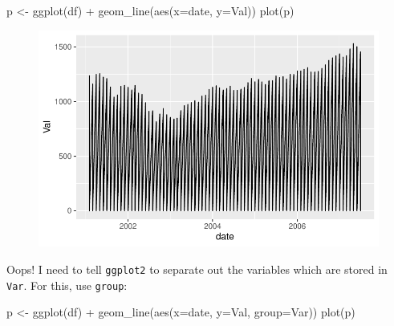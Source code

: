 \documentclass[
  letterpaper,
]{book}
\newenvironment{Shaded}{\begin{snugshade}}{\end{snugshade}}
\newcommand{\AttributeTok}[1]{\textcolor[rgb]{0.40,0.45,0.13}{#1}}
\newcommand{\FunctionTok}[1]{\textcolor[rgb]{0.28,0.35,0.67}{#1}}
\newcommand{\NormalTok}[1]{\textcolor[rgb]{0.00,0.23,0.31}{#1}}
\newcommand{\OtherTok}[1]{\textcolor[rgb]{0.00,0.23,0.31}{#1}}
\newcommand{\SpecialCharTok}[1]{\textcolor[rgb]{0.37,0.37,0.37}{#1}}
\begin{document}
\begin{Shaded}
\begin{Highlighting}[]
\NormalTok{p  }\OtherTok{\textless{}{-}} \FunctionTok{ggplot}\NormalTok{(df) }\SpecialCharTok{+}
  \FunctionTok{geom\_line}\NormalTok{(}\FunctionTok{aes}\NormalTok{(}\AttributeTok{x=}\NormalTok{date, }\AttributeTok{y=}\NormalTok{Val))}
\FunctionTok{plot}\NormalTok{(p)}
\end{Highlighting}
\end{Shaded}

\begin{figure}[H]

{\centering \includegraphics{Appendix1_files/figure-pdf/unnamed-chunk-6-1.pdf}

}

\end{figure}

Oops! I need to tell \texttt{ggplot2} to separate out the variables
which are stored in \texttt{Var}. For this, use \texttt{group}:

\begin{Shaded}
\begin{Highlighting}[]
\NormalTok{p  }\OtherTok{\textless{}{-}} \FunctionTok{ggplot}\NormalTok{(df) }\SpecialCharTok{+}
  \FunctionTok{geom\_line}\NormalTok{(}\FunctionTok{aes}\NormalTok{(}\AttributeTok{x=}\NormalTok{date, }\AttributeTok{y=}\NormalTok{Val, }\AttributeTok{group=}\NormalTok{Var))}
\FunctionTok{plot}\NormalTok{(p)}
\end{Highlighting}
\end{Shaded}
\end{document}
